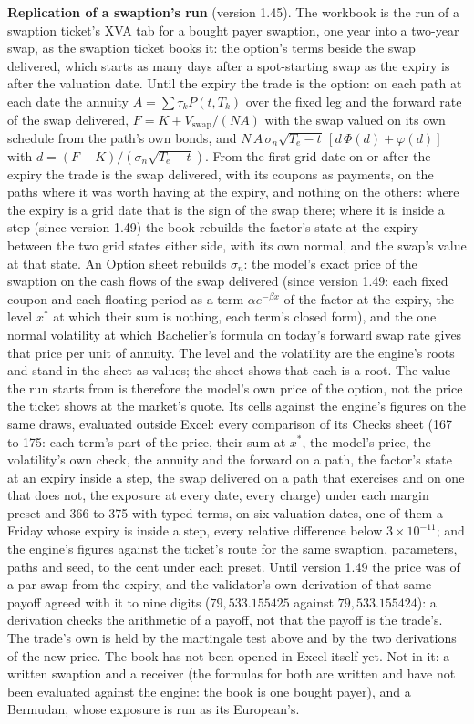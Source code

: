 \documentclass[11pt,a4paper]{article}
\newcommand{\code}[1]{\ifmmode\text{\small\texttt{\detokenize{#1}}}\else{\small\path{#1}}\fi}
\begin{document}
\textbf{Replication of a swaption's run} (version 1.45). The workbook \code{xva\_swaption} is the run of a swaption ticket's XVA tab for a bought payer swaption, one year into a two-year swap, as the swaption ticket books it: the option's terms beside the swap delivered, which starts as many days after a spot-starting swap as the expiry is after the valuation date. Until the expiry the trade is the option: on each path at each date the annuity $A=\sum\tau_k P(t,T_k)$ over the fixed leg and the forward rate of the swap delivered, $F=K+V_{\text{swap}}/(N A)$ with the swap valued on its own schedule from the path's own bonds, and $N\,A\,\sigma_n\sqrt{T_e-t}\,[d\,\Phi(d)+\varphi(d)]$ with $d=(F-K)/(\sigma_n\sqrt{T_e-t})$. From the first grid date on or after the expiry the trade is the swap delivered, with its coupons as payments, on the paths where it was worth having at the expiry, and nothing on the others: where the expiry is a grid date that is the sign of the swap there; where it is inside a step (since version 1.49) the book rebuilds the factor's state at the expiry between the two grid states either side, with its own normal, and the swap's value at that state. An Option sheet rebuilds $\sigma_n$: the model's exact price of the swaption on the cash flows of the swap delivered (since version 1.49: each fixed coupon and each floating period as a term $\alpha e^{-\beta x}$ of the factor at the expiry, the level $x^*$ at which their sum is nothing, each term's closed form), and the one normal volatility at which Bachelier's formula on today's forward swap rate gives that price per unit of annuity. The level and the volatility are the engine's roots and stand in the sheet as values; the sheet shows that each is a root. The value the run starts from is therefore the model's own price of the option, not the price the ticket shows at the market's quote. Its cells against the engine's figures on the same draws, evaluated outside Excel: every comparison of its Checks sheet (167 to 175: each term's part of the price, their sum at $x^*$, the model's price, the volatility's own check, the annuity and the forward on a path, the factor's state at an expiry inside a step, the swap delivered on a path that exercises and on one that does not, the exposure at every date, every charge) under each margin preset and 366 to 375 with typed terms, on six valuation dates, one of them a Friday whose expiry is inside a step, every relative difference below $3\times10^{-11}$; and the engine's figures against the ticket's route for the same swaption, parameters, paths and seed, to the cent under each preset. Until version 1.49 the price was of a par swap from the expiry, and the validator's own derivation of that same payoff agreed with it to nine digits ($79{,}533.155425$ against $79{,}533.155424$): a derivation checks the arithmetic of a payoff, not that the payoff is the trade's. The trade's own is held by the martingale test above and by the two derivations of the new price. The book has not been opened in Excel itself yet. Not in it: a written swaption and a receiver (the formulas for both are written and have not been evaluated against the engine: the book is one bought payer), and a Bermudan, whose exposure is run as its European's.
\end{document}
